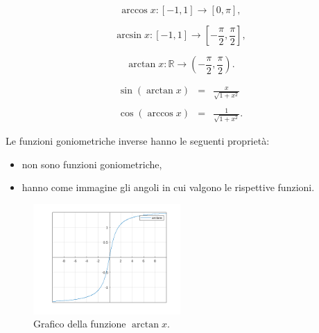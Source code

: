 \begin{equation*}
    \arccos x\colon [-1,1]\rightarrow[0,\pi],
\end{equation*}

\begin{equation*}
    \arcsin x\colon [-1,1]\rightarrow\left[-\frac{\pi}{2},\frac{\pi}{2}\right],
\end{equation*}

\begin{equation*}
    \arctan x\colon \mathbb R\rightarrow\left(-\frac{\pi}{2},\frac{\pi}{2}\right).
\end{equation*}

\begin{definition}
    \begin{equation*}
        \begin{matrix}
            \sin(\arctan x) &=& \frac{x}{\sqrt{1+x^2}}\\\\
            \cos(\arccos x) &=& \frac{1}{\sqrt{1+x^2}}.
        \end{matrix}
    \end{equation*}
\end{definition}

\begin{property}
    Le funzioni goniometriche inverse hanno le seguenti proprietà:
    \begin{itemize}
        \item non sono funzioni goniometriche,
        \item hanno come immagine gli angoli in cui valgono le rispettive funzioni.
    \end{itemize}
\end{property}

\begin{figure}
    \centering
    \includegraphics[width=0.5\textwidth]{Analisi1/figures/arctanx.png}
    \caption{Grafico della funzione $\arctan x$.}
    \label{fig:arctanx}
\end{figure}

